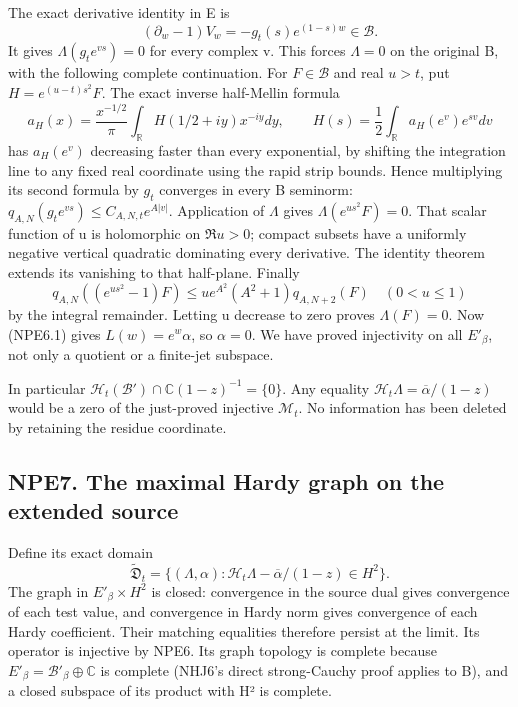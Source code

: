 The exact derivative identity in E is \[
(\partial_w-1)V_w=-g_t(s)e^{(1-s)w}\in\mathcal B.
\tag{NPE6.3}
\] It gives \(\Lambda(g_te^{vs})=0\) for every complex v. This forces
\(\Lambda=0\) on the original B, with the following complete
continuation. For \(F\in\mathcal B\) and real \(u>t\), put
\(H=e^{(u-t)s^2}F\). The exact inverse half-Mellin formula \[
a_H(x)=\frac{x^{-1/2}}\pi\int_{\mathbb R}H(1/2+iy)x^{-iy}dy,\qquad
H(s)=\frac12\int_{\mathbb R}a_H(e^v)e^{sv}dv
\tag{NPE6.4}
\] has \(a_H(e^v)\) decreasing faster than every exponential, by
shifting the integration line to any fixed real coordinate using the
rapid strip bounds. Hence multiplying its second formula by \(g_t\)
converges in every B seminorm:
\(q_{A,N}(g_te^{vs})\le C_{A,N,t}e^{A|v|}\). Application of \(\Lambda\)
gives \(\Lambda(e^{us^2}F)=0\). That scalar function of u is holomorphic
on \(\Re u>0\); compact subsets have a uniformly negative vertical
quadratic dominating every derivative. The identity theorem extends its
vanishing to that half-plane. Finally \[
q_{A,N}((e^{us^2}-1)F)\le u e^{A^2}(A^2+1)q_{A,N+2}(F)\quad(0<u\le1)
\] by the integral remainder. Letting u decrease to zero proves
\(\Lambda(F)=0\). Now (NPE6.1) gives \(L(w)=e^w\alpha\), so
\(\alpha=0\). We have proved injectivity on all \(E'_\beta\), not only a
quotient or a finite-jet subspace.

In particular
\(\mathcal H_t(\mathcal B')\cap\mathbb C(1-z)^{-1}=\{0\}\). Any equality
\(\mathcal H_t\Lambda=\overline\alpha/(1-z)\) would be a zero of the
just-proved injective \(\mathcal M_t\). No information has been deleted
by retaining the residue coordinate.

\subsection{NPE7. The maximal Hardy graph on the extended
source}\label{npe7.-the-maximal-hardy-graph-on-the-extended-source}

Define its exact domain \[
\widetilde{\mathfrak D}_t
=\{(\Lambda,\alpha):\mathcal H_t\Lambda-\overline\alpha/(1-z)\in H^2\}.
\tag{NPE7.1}
\] The graph in \(E'_\beta\times H^2\) is closed: convergence in the
source dual gives convergence of each test value, and convergence in
Hardy norm gives convergence of each Hardy coefficient. Their matching
equalities therefore persist at the limit. Its operator is injective by
NPE6. Its graph topology is complete because
\(E'_\beta=\mathcal B'_\beta\oplus\mathbb C\) is complete (NHJ6's direct
strong-Cauchy proof applies to B), and a closed subspace of its product
with H² is complete.

